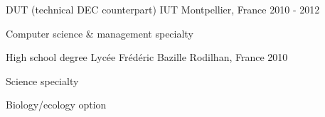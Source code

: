 \begin{cventries}
  \cventry
    {DUT (technical DEC counterpart)} %
    {IUT} %
    {Montpellier, France} %
    {2010 - 2012} %
    {
      \begin{cvitems} %
        \item {Computer science \& management specialty}
      \end{cvitems}
    }

  \cventry
    {High school degree} %
    {Lycée Frédéric Bazille} %
    {Rodilhan, France} %
    {2010} %
    {
      \begin{cvitems} %
        \item {Science specialty}
        \item {Biology/ecology option}
      \end{cvitems}
    }

\end{cventries}
